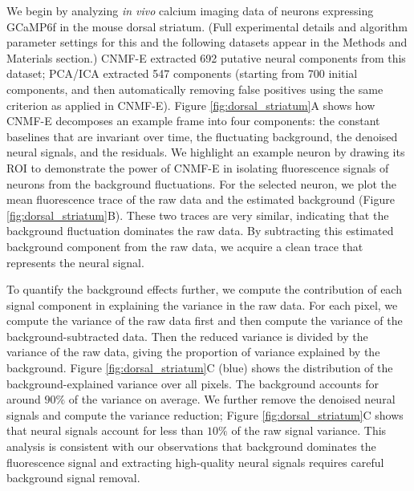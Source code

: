 \documentclass[9pt,lineno]{elife}
\begin{document}
We begin by analyzing \emph{in vivo} calcium imaging data of neurons expressing GCaMP6f in the mouse dorsal striatum.  (Full experimental details and algorithm parameter settings for this and the following datasets appear in the Methods and Materials section.)
CNMF-E extracted 692 putative neural components from this dataset; PCA/ICA extracted 547 components (starting from 700 initial components, and then automatically removing false positives using the same criterion as applied in CNMF-E).
Figure \ref{fig:dorsal_striatum}A shows how CNMF-E decomposes an example frame into four components: the constant baselines that are invariant over time, the fluctuating background, the denoised neural signals, and the residuals. We highlight an example neuron by drawing its ROI to demonstrate the power of  CNMF-E in isolating  fluorescence signals of neurons from the background fluctuations. For the selected neuron, we plot the mean fluorescence trace of the raw data and the estimated background (Figure \ref{fig:dorsal_striatum}B). These two traces are very similar, indicating that the background fluctuation dominates the raw data. By subtracting this estimated background component from the raw data, we acquire a clean trace that represents the neural signal. 

To quantify the background effects further, we compute the contribution of each signal component in explaining the variance in the raw data. For each pixel, we compute the variance of the raw data first and then compute the variance of the background-subtracted data. Then the reduced variance is divided by the variance of the raw data, giving the proportion of variance explained by the background. Figure \ref{fig:dorsal_striatum}C (blue) shows the distribution of the background-explained variance over all pixels. The background accounts for around $90\%$ of the variance on average. We further remove the denoised neural signals and compute the variance reduction; Figure \ref{fig:dorsal_striatum}C shows that neural signals account for less than $10\%$ of the raw signal variance. This analysis is consistent with our observations that background dominates the fluorescence signal and  extracting high-quality neural signals requires careful background signal removal.  
\end{document}
